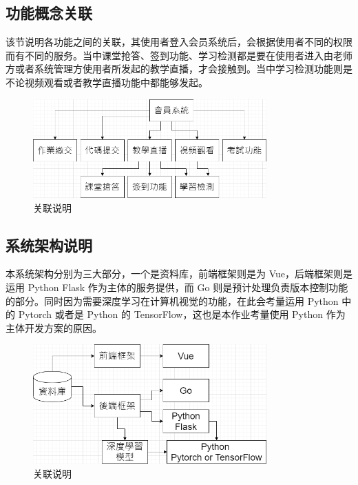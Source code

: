 \subsection{功能概念关联}

该节说明各功能之间的关联，其使用者登入会员系统后，会根据使用者不同的权限而有不同的服务。当中课堂抢答、签到功能、学习检测都是要在使用者进入由老师方或者系统管理方使用者所发起的教学直播，才会接触到。当中学习检测功能则是不论视频观看或者教学直播功能中都能够发起。

\begin{figure}[htb]
\centering 
\includegraphics[width=0.80\textwidth]{img/ch1m2.png} 
\caption{关联说明}
\label{Test}
\end{figure}

\subsection{系统架构说明}

本系统架构分别为三大部分，一个是资料库，前端框架则是为 Vue，后端框架则是运用 Python Flask 作为主体的服务提供，而 Go 则是预计处理负责版本控制功能的部分。同时因为需要深度学习在计算机视觉的功能，在此会考量运用 Python 中的 Pytorch 或者是 Python 的 TensorFlow，这也是本作业考量使用 Python 作为主体开发方案的原因。

\begin{figure}[htb]
\centering 
\includegraphics[width=0.80\textwidth]{img/ch1m3.png} 
\caption{关联说明}
\label{Test}
\end{figure}

